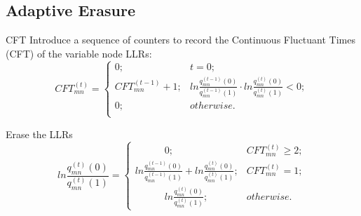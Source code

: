 \def\CTeXPreproc{Created by ctex v0.2.12, don't edit!}\documentclass{beamer}
\begin{document}
\subsection{Adaptive Erasure}
\begin{frame}
    \begin{block}{CFT}
        Introduce a sequence of counters to record the Continuous
        Fluctuant Times (CFT) of the variable node LLRs:
        \begin{equation*}
        {CFT_{mn}^{(t)}=}
            \begin{cases}
            0; & t=0;\\
            CFT_{mn}^{(t-1)}+1 ;& ln\frac{q_{mn}^{(t-1)}(0)}{q_{mn}^{(t-1)}(1)}\cdot ln\frac{q_{mn}^{(t)}(0)}{q_{mn}^{(t)}(1)}<0;\\
            0 ;& otherwise.\\
            \end{cases}
        \end{equation*}
    \end{block}
\end{frame}
\begin{frame}
    \begin{block}{Erase the LLRs}
        \large{
        \begin{equation*}
        {ln\frac{q_{mn}^{(t)}(0)}{q_{mn}^{(t)}(1)}=}
            \begin{cases}
            \quad\quad\quad 0 ;& CFT_{mn}^{(t)} \geq 2;\\
            ln\frac{q_{mn}^{(t-1)}(0)}{q_{mn}^{(t-1)}(1)}+ln\frac{q_{mn}^{(t)}(0)}{q_{mn}^{(t)}(1)};& CFT_{mn}^{(t)}=1;\\
            \quad \quad\quad ln\frac{q_{mn}^{(t)}(0)}{q_{mn}^{(t)}(1)} ;& otherwise.
            \end{cases}
        \end{equation*}}
    \end{block}
\end{frame}
\end{document}
